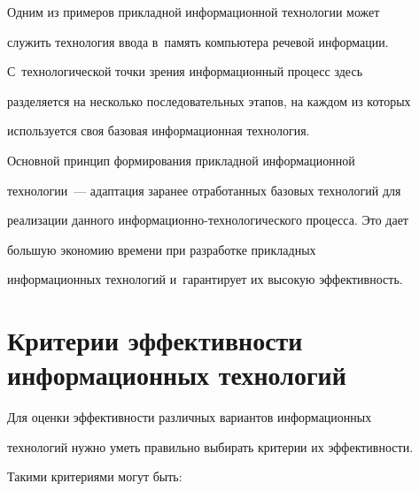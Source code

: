    Одним из примеров прикладной информационной технологии может 


служить технология ввода в~память компьютера речевой информации. 


С~технологической точ\-ки зрения информационный процесс здесь 


разделяется на несколько последовательных этапов, на каж\-дом из которых 


используется своя базовая информационная технология. 


   


   Основной принцип формирования при\-клад\-ной информационной 


технологии~--- адаптация заранее отработанных базовых технологий для 


реализации данного ин\-фор\-ма\-ци\-он\-но-тех\-но\-ло\-ги\-че\-ско\-го процесса. Это дает 


большую экономию времени при разработке при\-клад\-ных 


информационных технологий и~гарантирует их высокую эф\-фек\-тив\-ность. 


   


   \section{Критерии эффективности информационных технологий}


   


   Для оценки эффективности различных вариантов информационных 


технологий нуж\-но уметь правильно выбирать критерии их эф\-фек\-тив\-ности. 


Такими критериями могут быть:


